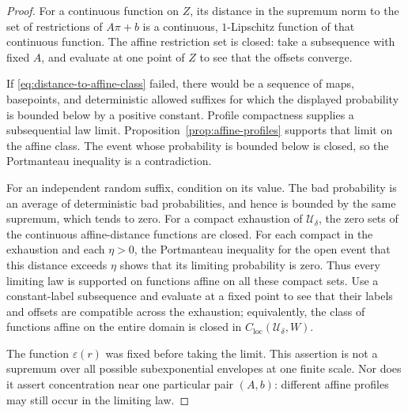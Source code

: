 \begin{proof}
For a continuous function on $Z$, its distance in the supremum
norm to the set of restrictions of $A\pi+b$ is a continuous,
$1$-Lipschitz function of that continuous function.  The affine
restriction set is closed: take a subsequence with fixed $A$,
and evaluate at one point of $Z$ to see that the offsets converge.

If \eqref{eq:distance-to-affine-class} failed, there would be a
sequence of maps, basepoints, and deterministic allowed suffixes
for which the displayed probability is bounded below by a positive
constant.  Profile compactness supplies a subsequential law limit.
Proposition~\ref{prop:affine-profiles} supports that limit on the
affine class.  The event whose probability is bounded below is
closed, so the Portmanteau inequality is a contradiction.

For an independent random suffix, condition on its value.  The
bad probability is an average of deterministic bad probabilities,
and hence is bounded by the same supremum, which tends to zero.
For a compact exhaustion of $\mathcal U_\delta$, the zero sets of
the continuous affine-distance functions are closed.  For each
compact in the exhaustion and each $\eta>0$, the Portmanteau
inequality for the open event that this distance exceeds $\eta$
shows that its limiting probability is zero.  Thus every limiting
law is supported on functions affine on all these compact sets.  Use a
constant-label subsequence and evaluate at a fixed point to see
that their labels and offsets are compatible across the exhaustion;
equivalently, the class of functions affine on the entire domain
is closed in $C_{\mathrm{loc}}(\mathcal U_\delta,W)$.

The function $\varepsilon(r)$ was fixed before taking the limit.
This assertion is not a supremum over all possible subexponential
envelopes at one finite scale.  Nor does it assert concentration
near one particular pair $(A,b)$: different affine profiles may
still occur in the limiting law.
\end{proof}
